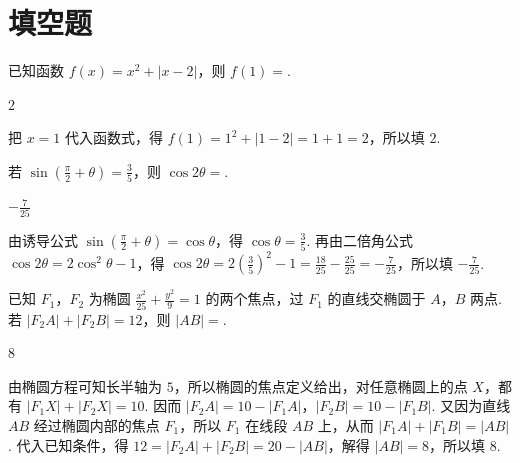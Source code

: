 \section{填空题}

\begin{problem}
已知函数 \( f(x) = x^2 + |x - 2| \)，则 \( f(1) = \)\fillinblank{}.
\end{problem}

\begin{answer}
\(2\)
\end{answer}

\begin{solution}
把 \(x=1\) 代入函数式，得 \(f(1)=1^2+|1-2|=1+1=2\)，所以填 \(2\).
\end{solution}

\begin{problem}
若 \(\sin \left(\frac{\pi}{2} + \theta\right) = \frac{3}{5}\)，则 \(\cos 2\theta =\)\fillinblank{}.
\end{problem}

\begin{answer}
\(-\frac{7}{25}\)
\end{answer}

\begin{solution}
由诱导公式 \(\sin\left(\frac\pi2+\theta\right)=\cos\theta\)，得 \(\cos\theta=\frac35\). 再由二倍角公式 \(\cos2\theta=2\cos^2\theta-1\)，得 \(\cos2\theta=2\left(\frac35\right)^2-1=\frac{18}{25}-\frac{25}{25}=-\frac7{25}\)，所以填 \(-\frac7{25}\).
\end{solution}

\begin{problem}
已知 \(F_{1}\)，\(F_{2}\) 为椭圆 \(\frac{x^{2}}{25} + \frac{y^{2}}{9} = 1\) 的两个焦点，过 \(F_{1}\) 的直线交椭圆于 \(A\)，\(B\) 两点. 若 \(|F_{2}A| + |F_{2}B| = 12\)，则 \(|AB| = \)\fillinblank{}.
\end{problem}

\begin{answer}
\(8\)
\end{answer}

\begin{solution}
由椭圆方程可知长半轴为 \(5\)，所以椭圆的焦点定义给出，对任意椭圆上的点 \(X\)，都有 \(|F_1X|+|F_2X|=10\). 因而 \(|F_2A|=10-|F_1A|\)，\(|F_2B|=10-|F_1B|\). 又因为直线 \(AB\) 经过椭圆内部的焦点 \(F_1\)，所以 \(F_1\) 在线段 \(AB\) 上，从而 \(|F_1A|+|F_1B|=|AB|\). 代入已知条件，得 \(12=|F_2A|+|F_2B|=20-|AB|\)，解得 \(|AB|=8\)，所以填 \(8\).
\end{solution}

